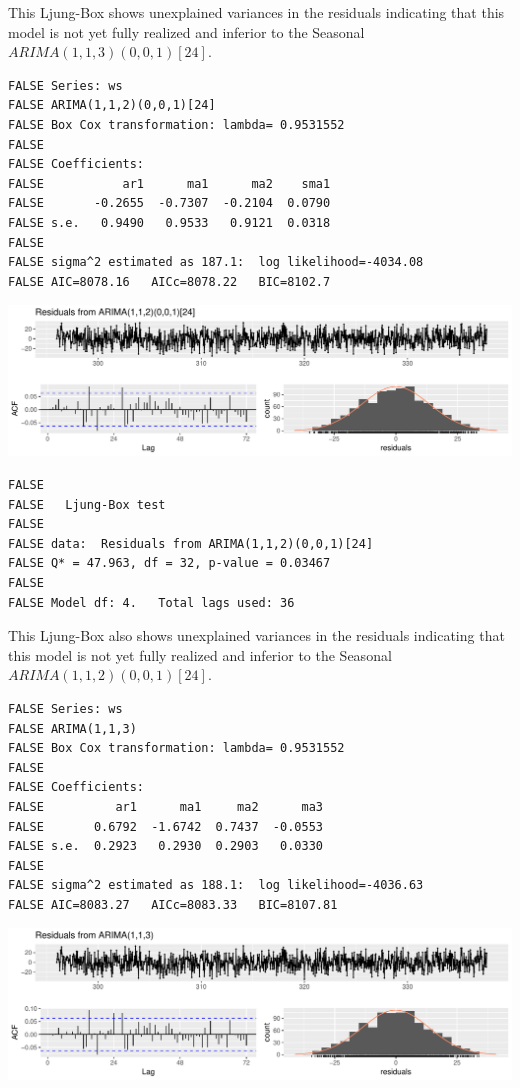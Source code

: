\documentclass[openany]{book}
\begin{document}
This Ljung-Box shows unexplained variances in the residuals indicating
that this model is not yet fully realized and inferior to the Seasonal
\(ARIMA (1,1,3)(0,0,1)[24]\).

\begin{verbatim}
FALSE Series: ws 
FALSE ARIMA(1,1,2)(0,0,1)[24] 
FALSE Box Cox transformation: lambda= 0.9531552 
FALSE 
FALSE Coefficients:
FALSE           ar1      ma1      ma2    sma1
FALSE       -0.2655  -0.7307  -0.2104  0.0790
FALSE s.e.   0.9490   0.9533   0.9121  0.0318
FALSE 
FALSE sigma^2 estimated as 187.1:  log likelihood=-4034.08
FALSE AIC=8078.16   AICc=8078.22   BIC=8102.7
\end{verbatim}

\includegraphics{Group2_Project1_Fall2019_files/figure-latex/unnamed-chunk-25-1.pdf}

\begin{verbatim}
FALSE 
FALSE   Ljung-Box test
FALSE 
FALSE data:  Residuals from ARIMA(1,1,2)(0,0,1)[24]
FALSE Q* = 47.963, df = 32, p-value = 0.03467
FALSE 
FALSE Model df: 4.   Total lags used: 36
\end{verbatim}

This Ljung-Box also shows unexplained variances in the residuals
indicating that this model is not yet fully realized and inferior to the
Seasonal \(ARIMA (1,1,2)(0,0,1)[24]\).

\begin{verbatim}
FALSE Series: ws 
FALSE ARIMA(1,1,3) 
FALSE Box Cox transformation: lambda= 0.9531552 
FALSE 
FALSE Coefficients:
FALSE          ar1      ma1     ma2      ma3
FALSE       0.6792  -1.6742  0.7437  -0.0553
FALSE s.e.  0.2923   0.2930  0.2903   0.0330
FALSE 
FALSE sigma^2 estimated as 188.1:  log likelihood=-4036.63
FALSE AIC=8083.27   AICc=8083.33   BIC=8107.81
\end{verbatim}

\includegraphics{Group2_Project1_Fall2019_files/figure-latex/unnamed-chunk-26-1.pdf}
\end{document}
